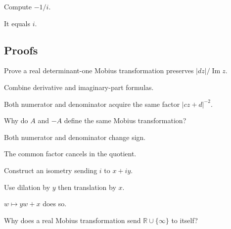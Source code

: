 \begin{hint}
Compute \(-1/i\).
\end{hint}

\begin{solution}
It equals \(i\).
\end{solution}

\subsection*{Proofs}

\begin{exercise}\label{exr:vii33-ped-06}
Prove a real determinant-one Mobius transformation preserves \(|dz|/\operatorname{Im}z\).
\end{exercise}

\begin{hint}
Combine derivative and imaginary-part formulas.
\end{hint}

\begin{solution}
Both numerator and denominator acquire the same factor \(|cz+d|^{-2}\).
\end{solution}

\begin{exercise}[Projectivization]\label{exr:vii33-ped-07}
Why do \(A\) and \(-A\) define the same Mobius transformation?
\end{exercise}

\begin{hint}
Both numerator and denominator change sign.
\end{hint}

\begin{solution}
The common factor cancels in the quotient.
\end{solution}

\begin{exercise}[Transitivity]\label{exr:vii33-ped-08}
Construct an isometry sending \(i\) to \(x+iy\).
\end{exercise}

\begin{hint}
Use dilation by \(y\) then translation by \(x\).
\end{hint}

\begin{solution}
\(w\mapsto yw+x\) does so.
\end{solution}

\begin{exercise}\label{exr:vii33-ped-09}
Why does a real Mobius transformation send \(\mathbb R\cup\{\infty\}\) to itself?
\end{exercise}

